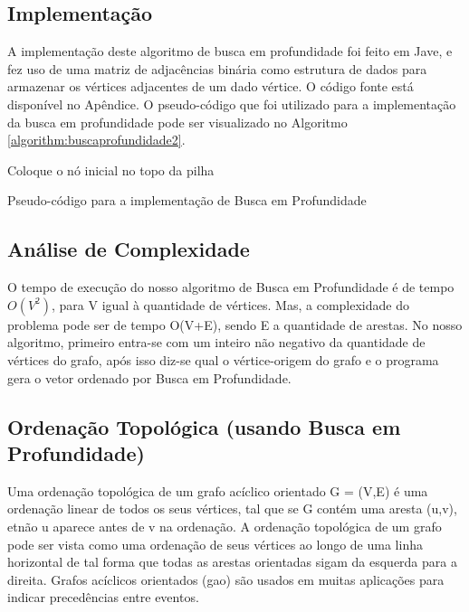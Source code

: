 \documentclass[a4paper,12pt]{article}
\begin{document}
\subsection{Implementação}

A implementação deste algoritmo de busca em profundidade foi feito em Jave, e fez uso de uma matriz de adjacências binária como estrutura de dados para armazenar os vértices adjacentes de um dado vértice. O código fonte está disponível no Apêndice. O pseudo-código que foi utilizado para a implementação da busca em profundidade pode ser visualizado no Algoritmo \ref{algorithm:buscaprofundidade2}.

\begin{algorithm}[H]
\SetAlgoLined
\LinesNumbered
{}
Coloque o nó inicial no topo da pilha\;
\caption{Pseudo-código para a implementação de Busca em Profundidade}
\label{algorithm:buscaprofundidade2}
\end{algorithm}


\subsection{Análise de Complexidade}

O tempo de execução do nosso algoritmo de Busca em Profundidade é de tempo $O(V^2)$, para V igual à quantidade de vértices. Mas, a complexidade do problema pode ser de tempo O(V+E), sendo E a quantidade de arestas.
No nosso algoritmo, primeiro entra-se com um inteiro não negativo da quantidade de vértices do grafo, após isso diz-se qual o vértice-origem do grafo e o programa gera o vetor ordenado por Busca em Profundidade.

\subsection{Ordenação Topológica (usando Busca em Profundidade)}

Uma ordenação topológica de um grafo acíclico orientado G = (V,E) é uma ordenação linear de todos os seus vértices, tal que se G contém uma aresta (u,v), etnão u aparece antes de v na ordenação. A ordenação topológica de um grafo pode ser vista como uma ordenação de seus vértices ao longo de uma linha horizontal de tal forma que todas as arestas orientadas sigam da esquerda para a direita. 
Grafos acíclicos orientados (gao) são usados em muitas aplicações para indicar precedências entre eventos.\\
\end{document}
